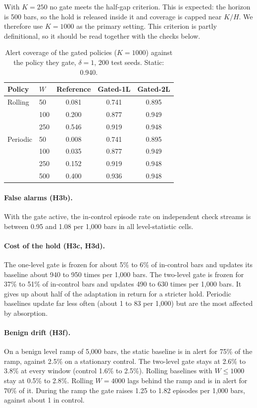 \documentclass[11pt]{article}
\begin{document}
With $K=250$ no gate meets the half-gap criterion. This is expected: the horizon is 500 bars, so the hold is released inside it and coverage is capped near $K/H$. We therefore use $K=1000$ as the primary setting. This criterion is partly definitional, so it should be read together with the checks below.

\begin{table}[t]
\centering
\caption{Alert coverage of the gated policies ($K=1000$) against the policy they gate, $\delta=1$, 200 test seeds. Static: 0.940.}
\label{tab:gate}
\begin{tabular}{llccc}
\toprule
Policy & $W$ & Reference & Gated-1L & Gated-2L\\
\midrule
Rolling & 50 & 0.081 & 0.741 & 0.895\\
 & 100 & 0.200 & 0.877 & 0.949\\
 & 250 & 0.546 & 0.919 & 0.948\\
Periodic & 50 & 0.008 & 0.741 & 0.895\\
 & 100 & 0.035 & 0.877 & 0.949\\
 & 250 & 0.152 & 0.919 & 0.948\\
 & 500 & 0.400 & 0.936 & 0.948\\
\bottomrule
\end{tabular}
\end{table}

\paragraph{False alarms (H3b).} With the gate active, the in-control episode rate on independent check streams is between 0.95 and 1.08 per 1{,}000 bars in all level-statistic cells.

\paragraph{Cost of the hold (H3c, H3d).} The one-level gate is frozen for about 5\% to 6\% of in-control bars and updates its baseline about 940 to 950 times per 1{,}000 bars. The two-level gate is frozen for 37\% to 51\% of in-control bars and updates 490 to 630 times per 1{,}000 bars. It gives up about half of the adaptation in return for a stricter hold. Periodic baselines update far less often (about 1 to 83 per 1{,}000) but are the most affected by absorption.

\paragraph{Benign drift (H3f).} On a benign level ramp of 5{,}000 bars, the static baseline is in alert for 75\% of the ramp, against 2.5\% on a stationary control. The two-level gate stays at 2.6\% to 3.8\% at every window (control 1.6\% to 2.5\%). Rolling baselines with $W\le1000$ stay at 0.5\% to 2.8\%. Rolling $W=4000$ lags behind the ramp and is in alert for 70\% of it. During the ramp the gate raises 1.25 to 1.82 episodes per 1{,}000 bars, against about 1 in control.
\end{document}
